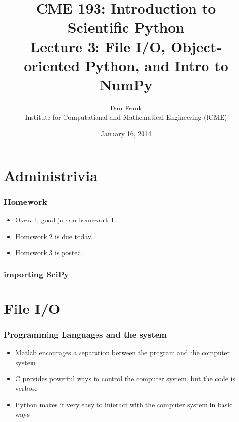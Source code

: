 \documentclass{beamer}
\title{CME 193: Introduction to Scientific Python \\
Lecture 3: File I/O, Object-oriented Python, and Intro to NumPy}
\author{
Dan Frank \\
\vspace{0.1in}
Institute for Computational and Mathematical Engineering (ICME)}
\date{January 16, 2014}
\begin{document}
\maketitle

\section{Administrivia}
\begin{frame}
\frametitle{Homework}
\begin{itemize}
\setlength{\itemsep}{0.1in}
\item{Overall, good job on homework 1.}
\item{Homework 2 is due today.}
\item{Homework 3 is posted.}
\end{itemize}
\end{frame}

\begin{frame}
\frametitle{importing SciPy}


\end{frame}





\section{File I/O}
\begin{frame}
\frametitle{Programming Languages and the system}
\begin{itemize}
\setlength{\itemsep}{0.1in}
\item{Matlab encourages a separation between the program and the computer system}
\item{C provides powerful ways to control the computer system, but the code is verbose}
\item{Python makes it very easy to interact with the computer system in basic ways}
\end{itemize}
\end{frame}
\end{document}
